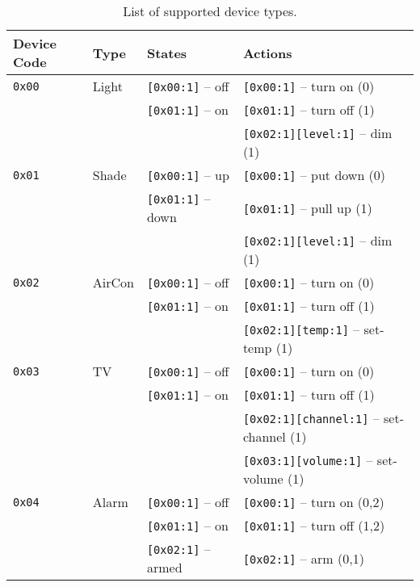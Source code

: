 \begin{table}[ht!]
\centering
\begin{tabular}{l l l l}
\hline
\textbf{Device Code} & \textbf{Type} & \textbf{States} & \textbf{Actions} \\
\hline
\hline

{\tt 0x00}  & Light     & {\tt [0x00:1]} -- off    & {\tt [0x00:1]} -- turn on (0) \\
            &           & {\tt [0x01:1]} -- on     & {\tt [0x01:1]} -- turn off (1) \\
            &           &                          & {\tt [0x02:1][level:1]} -- dim (1) \\
\hline
{\tt 0x01}  & Shade     & {\tt [0x00:1]} -- up     & {\tt [0x00:1]} -- put down (0) \\
            &           & {\tt [0x01:1]} -- down   & {\tt [0x01:1]} -- pull up (1) \\
            &           &                          & {\tt [0x02:1][level:1]} -- dim (1) \\
\hline
{\tt 0x02}  & AirCon    & {\tt [0x00:1]} -- off    & {\tt [0x00:1]} -- turn on (0) \\
            &           & {\tt [0x01:1]} -- on     & {\tt [0x01:1]} -- turn off (1) \\
            &           &                          & {\tt [0x02:1][temp:1]} -- set-temp (1) \\
\hline
{\tt 0x03}  & TV        & {\tt [0x00:1]} -- off    & {\tt [0x00:1]} -- turn on (0) \\
            &           & {\tt [0x01:1]} -- on     & {\tt [0x01:1]} -- turn off (1) \\
            &           &                          & {\tt [0x02:1][channel:1]} -- set-channel (1) \\
            &           &                          & {\tt [0x03:1][volume:1]} -- set-volume (1) \\
\hline
{\tt 0x04}  & Alarm     & {\tt [0x00:1]} -- off    & {\tt [0x00:1]} -- turn on (0,2) \\
            &           & {\tt [0x01:1]} -- on     & {\tt [0x01:1]} -- turn off (1,2) \\
            &           & {\tt [0x02:1]} -- armed  & {\tt [0x02:1]} -- arm (0,1) \\
\hline
\hline
\end{tabular}
\caption{\label{tab:pdus:pdu:init_types}List of supported device types.}
\end{table}

